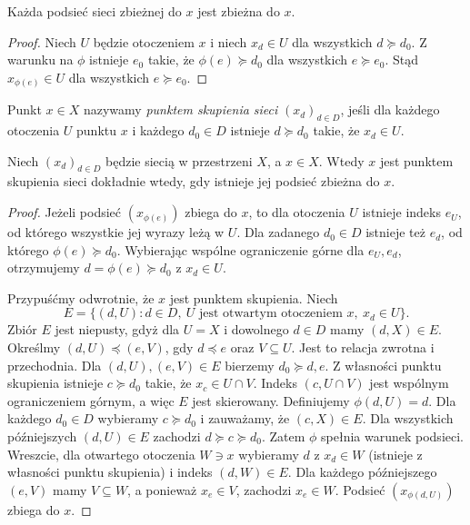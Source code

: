 \begin{stwierdzenie}
\label{prop:topog-podsiec-granica}
Każda podsieć sieci zbieżnej do $x$ jest zbieżna do $x$.
\end{stwierdzenie}
\begin{proof}
Niech $U$ będzie otoczeniem $x$ i niech
$x_d\in U$ dla wszystkich $d\succeq d_0$.
Z warunku na $\phi$ istnieje $e_0$ takie,
że $\phi(e)\succeq d_0$ dla wszystkich $e\succeq e_0$.
Stąd $x_{\phi(e)}\in U$ dla wszystkich $e\succeq e_0$.
\end{proof}

\begin{definicja}
\label{def:topog-punkt-skupienia-sieci}
Punkt $x\in X$ nazywamy \emph{punktem skupienia sieci}
$(x_d)_{d\in D}$, jeśli dla każdego otoczenia $U$
punktu $x$ i każdego $d_0\in D$ istnieje
$d\succeq d_0$ takie, że $x_d\in U$.
\end{definicja}

\begin{twierdzenie}
\label{thm:topog-punkt-skupienia-podsiec}
Niech $(x_d)_{d\in D}$ będzie siecią w przestrzeni
$X$, a $x\in X$. Wtedy $x$ jest punktem skupienia
sieci dokładnie wtedy, gdy istnieje jej podsieć
zbieżna do $x$.
\end{twierdzenie}
\begin{proof}
Jeżeli podsieć $(x_{\phi(e)})$ zbiega do $x$,
to dla otoczenia $U$ istnieje indeks $e_U$,
od którego wszystkie jej wyrazy leżą w $U$.
Dla zadanego $d_0\in D$ istnieje też $e_d$,
od którego $\phi(e)\succeq d_0$.
Wybierając wspólne ograniczenie górne dla $e_U,e_d$,
otrzymujemy $d=\phi(e)\succeq d_0$ z $x_d\in U$.

Przypuśćmy odwrotnie, że $x$ jest punktem skupienia.
Niech
\[
 E=\{(d,U):d\in D,\ U\text{ jest otwartym otoczeniem }x,
                                        \ x_d\in U\}.
\]
Zbiór $E$ jest niepusty, gdyż dla $U=X$
i dowolnego $d\in D$ mamy $(d,X)\in E$.
Określmy $(d,U)\preceq(e,V)$, gdy $d\preceq e$
oraz $V\subseteq U$. Jest to relacja zwrotna i przechodnia.
Dla $(d,U),(e,V)\in E$ bierzemy $d_0\succeq d,e$.
Z własności punktu skupienia istnieje $c\succeq d_0$
takie, że $x_c\in U\cap V$.
Indeks $(c,U\cap V)$ jest wspólnym ograniczeniem górnym,
a więc $E$ jest skierowany.
Definiujemy $\phi(d,U)=d$. Dla każdego $d_0\in D$
wybieramy $c\succeq d_0$ i zauważamy, że
$(c,X)\in E$. Dla wszystkich późniejszych
$(d,U)\in E$ zachodzi $d\succeq c\succeq d_0$.
Zatem $\phi$ spełnia warunek podsieci.
Wreszcie, dla otwartego otoczenia $W\ni x$
wybieramy $d$ z $x_d\in W$ (istnieje z własności
punktu skupienia) i indeks $(d,W)\in E$.
Dla każdego późniejszego $(e,V)$ mamy $V\subseteq W$,
a ponieważ $x_e\in V$, zachodzi $x_e\in W$.
Podsieć $(x_{\phi(d,U)})$ zbiega do $x$.
\end{proof}

